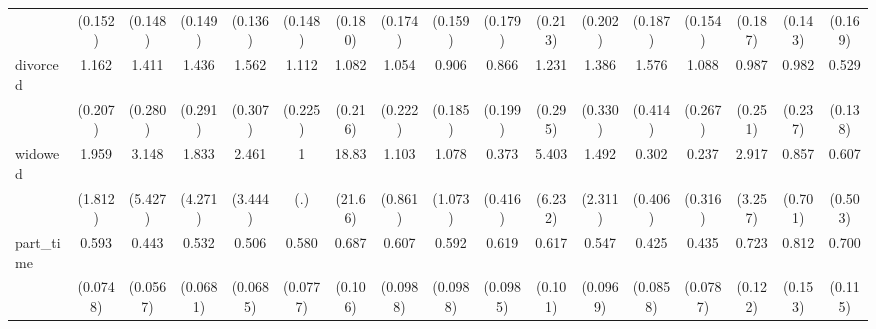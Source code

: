 {\begin{tabular}{l*{16}{c}}
                    &     (0.152)         &     (0.148)         &     (0.149)         &     (0.136)         &     (0.148)         &     (0.180)         &     (0.174)         &     (0.159)         &     (0.179)         &     (0.213)         &     (0.202)         &     (0.187)         &     (0.154)         &     (0.187)         &     (0.143)         &     (0.169)         \\
[1em]
divorced            &       1.162         &       1.411         &       1.436         &       1.562\sym{*}  &       1.112         &       1.082         &       1.054         &       0.906         &       0.866         &       1.231         &       1.386         &       1.576         &       1.088         &       0.987         &       0.982         &       0.529\sym{*}  \\
                    &     (0.207)         &     (0.280)         &     (0.291)         &     (0.307)         &     (0.225)         &     (0.216)         &     (0.222)         &     (0.185)         &     (0.199)         &     (0.295)         &     (0.330)         &     (0.414)         &     (0.267)         &     (0.251)         &     (0.237)         &     (0.138)         \\
[1em]
widowed             &       1.959         &       3.148         &       1.833         &       2.461         &           1         &       18.83\sym{*}  &       1.103         &       1.078         &       0.373         &       5.403         &       1.492         &       0.302         &       0.237         &       2.917         &       0.857         &       0.607         \\
                    &     (1.812)         &     (5.427)         &     (4.271)         &     (3.444)         &         (.)         &     (21.66)         &     (0.861)         &     (1.073)         &     (0.416)         &     (6.232)         &     (2.311)         &     (0.406)         &     (0.316)         &     (3.257)         &     (0.701)         &     (0.503)         \\
[1em]
part\_time           &       0.593\sym{***}&       0.443\sym{***}&       0.532\sym{***}&       0.506\sym{***}&       0.580\sym{***}&       0.687\sym{*}  &       0.607\sym{**} &       0.592\sym{**} &       0.619\sym{**} &       0.617\sym{**} &       0.547\sym{***}&       0.425\sym{***}&       0.435\sym{***}&       0.723         &       0.812         &       0.700\sym{*}  \\
                    &    (0.0748)         &    (0.0567)         &    (0.0681)         &    (0.0685)         &    (0.0777)         &     (0.106)         &    (0.0988)         &    (0.0988)         &    (0.0985)         &     (0.101)         &    (0.0969)         &    (0.0858)         &    (0.0787)         &     (0.122)         &     (0.153)         &     (0.115)         \\

\end{tabular}}
